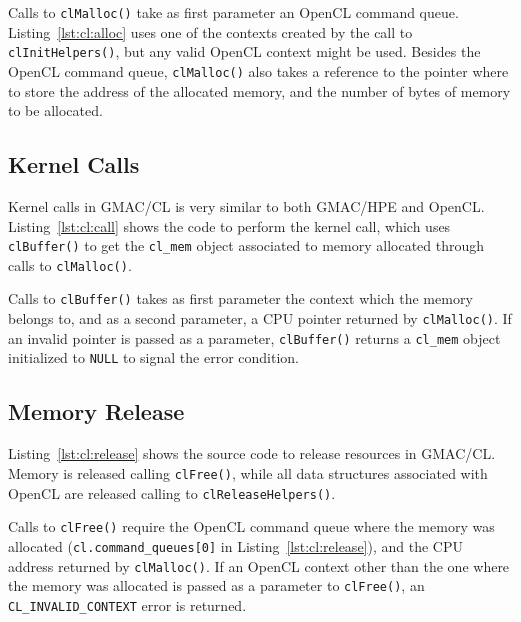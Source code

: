 

Calls to \texttt{clMalloc()} take as first parameter an OpenCL command queue.  
Listing~\ref{lst:cl:alloc} uses one of the contexts created by the call to \texttt{clInitHelpers()}, 
but any valid OpenCL context might be used. Besides the OpenCL command queue, \texttt{clMalloc()} 
also takes a reference to the pointer where to store the address of the allocated memory, and the 
number of bytes of memory to be allocated.

\subsection{Kernel Calls}
Kernel calls in GMAC\slash CL is very similar to both GMAC\slash HPE and OpenCL\@.  
Listing~\ref{lst:cl:call} shows the code to perform the kernel call, which uses 
\texttt{clBuffer()} to get the \texttt{cl\_mem} object associated to memory allocated through calls 
to \texttt{clMalloc()}.



Calls to \texttt{clBuffer()} takes as first parameter the context which the memory belongs to, and 
as a second parameter, a CPU pointer returned by \texttt{clMalloc()}.  If an invalid pointer is 
passed as a parameter, \texttt{clBuffer()} returns a \texttt{cl\_mem} object initialized to 
\texttt{NULL} to signal the error condition.

\subsection{Memory Release}
Listing~\ref{lst:cl:release} shows the source code to release resources in GMAC\slash CL\@. Memory 
is released calling \texttt{clFree()}, while all data structures associated with OpenCL are released 
calling to \texttt{clReleaseHelpers()}.



Calls to \texttt{clFree()} require the OpenCL command queue where the memory was allocated 
(\texttt{cl.command\_queues[0]} in Listing~\ref{lst:cl:release}), and the CPU address returned by 
\texttt{clMalloc()}. If an OpenCL context other than the one where the memory was allocated is 
passed as a parameter to \texttt{clFree()}, an \texttt{CL\_INVALID\_CONTEXT} error is returned.

